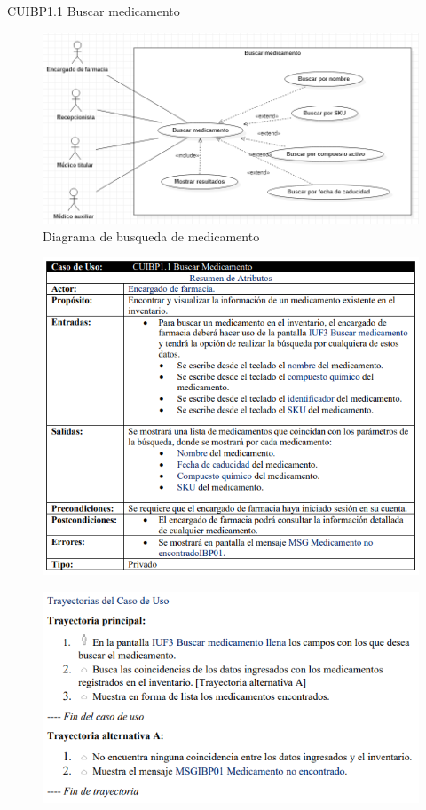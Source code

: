 \documentclass[12pt,letterpaper]{article}
\begin{document}
            \newpage
            CUIBP1.1 Buscar medicamento 
            \begin{figure}[H]
                \centering
                \includegraphics [scale=0.5]{casosUso/buscarMedicamento}
                \caption{Diagrama de busqueda de medicamento}
            \end{figure}
            \begin{figure}[H]
                \centering
                \includegraphics [scale=0.8]{specs/specBuscarMedicamento}
            \end{figure}
            \begin{figure}[H]
                \centering
                \includegraphics [scale=0.9]{specs/trayBuscarMedicamento}
            \end{figure}
\end{document}
